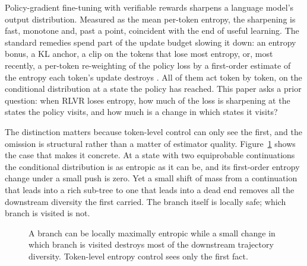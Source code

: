 \documentclass[11pt]{article}
\begin{document}
Policy-gradient fine-tuning with verifiable rewards sharpens a language model's
output distribution. Measured as the mean per-token entropy, the sharpening is fast,
monotone and, past a point, coincident with the end of useful learning. The standard
remedies spend part of the update budget slowing it down: an entropy bonus, a KL
anchor, a clip on the tokens that lose most entropy, or, most recently, a per-token
re-weighting of the policy loss by a first-order estimate of the entropy each token's
update destroys \citep{steer}. All of them act token by token, on the conditional
distribution at a state the policy has reached. This paper asks a prior question:
when RLVR loses entropy, how much of the loss is sharpening at the states the policy
visits, and how much is a change in which states it visits?

The distinction matters because token-level control can only see the first, and the
omission is structural rather than a matter of estimator quality.
Figure~\ref{fig:branch} shows the case that makes it concrete. At a state with two
equiprobable continuations the conditional distribution is as entropic as it can be,
and its first-order entropy change under a small push is zero. Yet a small shift of
mass from a continuation that leads into a rich sub-tree to one that leads into a
dead end removes all the downstream diversity the first carried. The branch itself
is locally safe; which branch is visited is not.

\begin{figure}[t]
\centering
{}
\caption{A branch can be locally maximally entropic while a small change in which
branch is visited destroys most of the downstream trajectory diversity. Token-level
entropy control sees only the first fact.}
\label{fig:branch}
\end{figure}
\end{document}
